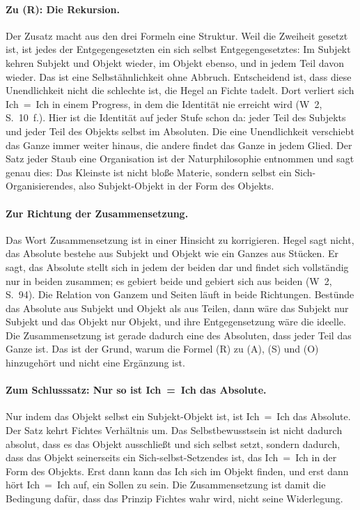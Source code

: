 \documentclass[11pt,a4paper]{article}
\newcommand{\SO}{Subjekt-Objekt}
\newcommand{\Werke}[1]{(W~2, S.~#1)}
\begin{document}
\paragraph{Zu (R): Die Rekursion.}
Der Zusatz macht aus den drei Formeln eine Struktur. Weil die Zweiheit gesetzt ist, ist \glqq jedes der Entgegengesetzten ein sich selbst Entgegengesetztes\grqq{}: Im Subjekt kehren Subjekt und Objekt wieder, im Objekt ebenso, und in jedem Teil davon wieder. Das ist eine Selbstähnlichkeit ohne Abbruch. Entscheidend ist, dass diese Unendlichkeit nicht die schlechte ist, die Hegel an Fichte tadelt. Dort verliert sich Ich~=~Ich in einem Progress, in dem die Identität nie erreicht wird \Werke{10~f.}. Hier ist die Identität auf jeder Stufe schon da: \glqq jeder Teil des Subjekts und jeder Teil des Objekts selbst im Absoluten\grqq{}. Die eine Unendlichkeit verschiebt das Ganze immer weiter hinaus, die andere findet das Ganze in jedem Glied. Der Satz \glqq jeder Staub eine Organisation\grqq{} ist der Naturphilosophie entnommen und sagt genau dies: Das Kleinste ist nicht bloße Materie, sondern selbst ein Sich-Organisierendes, also \SO{} in der Form des Objekts.

\paragraph{Zur Richtung der Zusammensetzung.}
Das Wort Zusammensetzung ist in einer Hinsicht zu korrigieren. Hegel sagt nicht, das Absolute bestehe aus Subjekt und Objekt wie ein Ganzes aus Stücken. Er sagt, das Absolute \glqq stellt sich in jedem der beiden dar\grqq{} und \glqq findet sich vollständig nur in beiden zusammen\grqq{}; es \glqq gebiert beide und gebiert sich aus beiden\grqq{} \Werke{94}. Die Relation von Ganzem und Seiten läuft in beide Richtungen. Bestünde das Absolute aus Subjekt und Objekt als aus Teilen, dann wäre das Subjekt nur Subjekt und das Objekt nur Objekt, und ihre Entgegensetzung wäre die ideelle. Die Zusammensetzung ist gerade dadurch eine des Absoluten, dass jeder Teil das Ganze ist. Das ist der Grund, warum die Formel (R) zu (A), (S) und (O) hinzugehört und nicht eine Ergänzung ist.

\paragraph{Zum Schlusssatz: Nur so ist Ich~=~Ich das Absolute.}
\glqq Nur indem das Objekt selbst ein \SO{} ist, ist Ich~=~Ich das Absolute.\grqq{} Der Satz kehrt Fichtes Verhältnis um. Das Selbstbewusstsein ist nicht dadurch absolut, dass es das Objekt ausschließt und sich selbst setzt, sondern dadurch, dass das Objekt seinerseits ein Sich-selbst-Setzendes ist, das Ich~=~Ich in der Form des Objekts. Erst dann kann das Ich sich im Objekt finden, und erst dann hört Ich~=~Ich auf, ein Sollen zu sein. Die Zusammensetzung ist damit die Bedingung dafür, dass das Prinzip Fichtes wahr wird, nicht seine Widerlegung.
\end{document}
